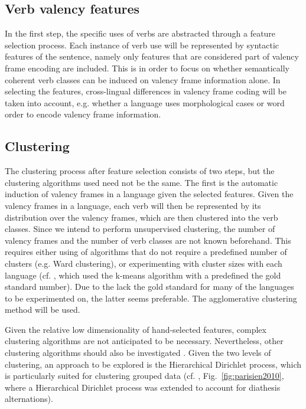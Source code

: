\subsection{Verb valency features}\label{subsec:features}

In the first step, the specific uses of verbs are abstracted through a feature selection process. Each instance of verb use will be represented by syntactic features of the sentence, namely only features that are considered part of valency frame encoding are included. This is in order to focus on whether semantically coherent verb classes can be induced on valency frame information alone. In selecting the features, cross-lingual differences in valency frame coding will be taken into account, e.g. whether a language uses morphological cases or word order to encode valency frame information.  


\subsection{Clustering}\label{subsec:clustering}

The clustering process after feature selection consists of two steps, but the clustering algorithms used need not be the same. The first is the automatic induction of valency frames in a language given the selected features. Given the valency frames in a language, each verb will then be represented by its distribution over the valency frames, which are then clustered into the verb classes. Since we intend to perform unsupervised clustering, the number of valency frames and the number of verb classes are not known beforehand. This requires either using of algorithms that do not require a predefined number of clusters (e.g. Ward clustering), or experimenting with cluster sizes with each language (cf. \cite{schulteimwalde2006}, which used the k-means algorithm with a predefined the gold standard number). Due to the lack the gold standard for many of the languages to be experimented on, the latter seems preferable. The agglomerative clustering method will be used.

Given the relative low dimensionality of hand-selected features, complex clustering algorithms are not anticipated to be necessary. Nevertheless, other clustering algorithms should also be investigated \citep{xu2015a}. Given the two levels of clustering, an approach to be explored is the Hierarchical Dirichlet process, which is particularly suited for clustering grouped data (cf. \citet{parisien2010}, Fig.~\ref{fig:parisien2010}, where a Hierarchical Dirichlet process was extended to account for diathesis alternations).

